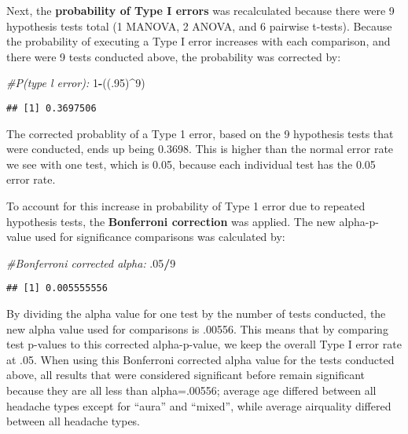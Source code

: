 \documentclass[]{article}
\newenvironment{Shaded}{\begin{snugshade}}{\end{snugshade}}
\newcommand{\CommentTok}[1]{\textcolor[rgb]{0.56,0.35,0.01}{\textit{#1}}}
\newcommand{\DecValTok}[1]{\textcolor[rgb]{0.00,0.00,0.81}{#1}}
\newcommand{\FloatTok}[1]{\textcolor[rgb]{0.00,0.00,0.81}{#1}}
\newcommand{\NormalTok}[1]{#1}
\newcommand{\OperatorTok}[1]{\textcolor[rgb]{0.81,0.36,0.00}{\textbf{#1}}}
\begin{document}
Next, the \textbf{probability of Type I errors} was recalculated because
there were 9 hypothesis tests total (1 MANOVA, 2 ANOVA, and 6 pairwise
t-tests). Because the probability of executing a Type I error increases
with each comparison, and there were 9 tests conducted above, the
probability was corrected by:

\begin{Shaded}
\begin{Highlighting}[]
\CommentTok{#P(type l error):}
\DecValTok{1}\OperatorTok{-}\NormalTok{((.}\DecValTok{95}\NormalTok{)}\OperatorTok{^}\DecValTok{9}\NormalTok{)}
\end{Highlighting}
\end{Shaded}

\begin{verbatim}
## [1] 0.3697506
\end{verbatim}

The corrected probablity of a Type 1 error, based on the 9 hypothesis
tests that were conducted, ends up being 0.3698. This is higher than the
normal error rate we see with one test, which is 0.05, because each
individual test has the 0.05 error rate.

To account for this increase in probability of Type 1 error due to
repeated hypothesis tests, the \textbf{Bonferroni correction} was
applied. The new alpha-p-value used for significance comparisons was
calculated by:

\begin{Shaded}
\begin{Highlighting}[]
\CommentTok{#Bonferroni corrected alpha:}
\FloatTok{.05}\OperatorTok{/}\DecValTok{9}
\end{Highlighting}
\end{Shaded}

\begin{verbatim}
## [1] 0.005555556
\end{verbatim}

By dividing the alpha value for one test by the number of tests
conducted, the new alpha value used for comparisons is .00556. This
means that by comparing test p-values to this corrected alpha-p-value,
we keep the overall Type I error rate at .05. When using this Bonferroni
corrected alpha value for the tests conducted above, all results that
were considered significant before remain significant because they are
all less than alpha=.00556; average age differed between all headache
types except for ``aura'' and ``mixed'', while average airquality
differed between all headache types.
\end{document}
